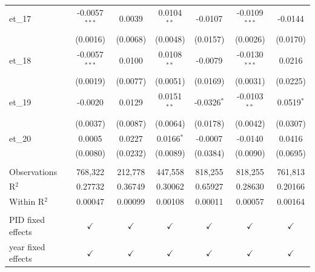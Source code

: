 \begin{tabular}{lcccccc}
   et\_17             & -0.0057$^{***}$  & 0.0039               & 0.0104$^{**}$         & -0.0107         & -0.0109$^{***}$ & -0.0144\\   
                      & (0.0016)         & (0.0068)             & (0.0048)              & (0.0157)        & (0.0026)        & (0.0170)\\   
   et\_18             & -0.0057$^{***}$  & 0.0100               & 0.0108$^{**}$         & -0.0079         & -0.0130$^{***}$ & 0.0216\\   
                      & (0.0019)         & (0.0077)             & (0.0051)              & (0.0169)        & (0.0031)        & (0.0225)\\   
   et\_19             & -0.0020          & 0.0129               & 0.0151$^{**}$         & -0.0326$^{*}$   & -0.0103$^{**}$  & 0.0519$^{*}$\\   
                      & (0.0037)         & (0.0087)             & (0.0064)              & (0.0178)        & (0.0042)        & (0.0307)\\   
   et\_20             & 0.0005           & 0.0227               & 0.0166$^{*}$          & -0.0007         & -0.0140         & 0.0416\\   
                      & (0.0080)         & (0.0232)             & (0.0089)              & (0.0384)        & (0.0090)        & (0.0695)\\   
    \\
   Observations       & 768,322          & 212,778              & 447,558               & 818,255         & 818,255         & 761,813\\  
   R$^2$              & 0.27732          & 0.36749              & 0.30062               & 0.65927         & 0.28630         & 0.20166\\  
   Within R$^2$       & 0.00047          & 0.00099              & 0.00108               & 0.00011         & 0.00057         & 0.00164\\  
    \\
   PID fixed effects  & $\checkmark$     & $\checkmark$         & $\checkmark$          & $\checkmark$    & $\checkmark$    & $\checkmark$\\   
   year fixed effects & $\checkmark$     & $\checkmark$         & $\checkmark$          & $\checkmark$    & $\checkmark$    & $\checkmark$\\   
   \bottomrule
\end{tabular}
\par\endgroup


